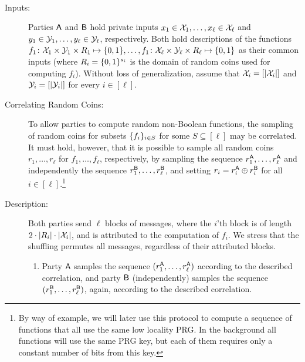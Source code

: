 

\begin{protocol} \label{prot:multi2psm}\
\begin{description}
\item[Inputs:]  Parties $\mathsf{A}$ and $\mathsf{B}$ hold private inputs $x_1\in\mathcal{X}_1, \ldots, x_{\ell}\in\mathcal{X}_{\ell}$ and $y_1\in\mathcal{Y}_1, \ldots, y_{\ell}\in\mathcal{Y}_{\ell}$, respectively. Both hold descriptions of the functions $f_1\colon \mathcal{X}_1\times\mathcal{Y}_1\times R_1\mapsto \{0,1\}, \ldots, f_1\colon \mathcal{X}_{\ell}\times\mathcal{Y}_{\ell}\times R_{\ell}\mapsto \{0,1\}$ as their common inputs (where $R_i=\{0,1\}^{s_i}$ is the domain of random coins used for computing $f_i$). Without loss of generalization, assume that $\mathcal{X}_i = [\left|\mathcal{X}_i\right|]$ and $\mathcal{Y}_i = [\left|\mathcal{Y}_i\right|]$ for every $i\in [\ell]$.

\item[Correlating Random Coins:]
To allow parties to compute random non-Boolean functions, the sampling of random coins for subsets $\{f_i\}_{i\in S}$ for some $S\subseteq[\ell]$ may be correlated. It must hold, however, that it is possible to sample all random coins $r_1,\ldots, r_{\ell}$ for $f_1,\ldots, f_{\ell}$, respectively, by sampling the  sequence $r_1^{\mathsf{A}},\ldots, r_{\ell}^{\mathsf{A}}$ and independently  the  sequence $r_1^{\mathsf{B}},\ldots, r_{\ell}^{\mathsf{B}}$, and setting $r_i = r_i^{\mathsf{A}}\oplus r_i^{\mathsf{B}}$ for all $i\in[\ell]$.\footnote{By way of example, we will later use this protocol to compute a sequence of functions that all use the same low locality PRG. In the background all functions will use the same PRG key, but each of them requires only a constant number of bits from this key.}
\item[Description:]
Both parties send $\ell$ blocks of messages, where the $i$'th block is of length $2\cdot\left|R_i\right|\cdot\left|\mathcal{X}_i\right|$, and is attributed to the computation of $f_i$. We stress that the shuffling permutes all messages, regardless of their attributed blocks.
\begin{enumerate}
\item  Party $\mathsf{A}$ samples the  sequence $(r_1^{\mathsf{A}},\ldots, r_{\ell}^{\mathsf{A}})$ according to the described correlation,   and party $\mathsf{B}$ (independently) samples the  sequence $(r_1^{\mathsf{B}},\ldots, r_{\ell}^{\mathsf{B}})$, again, according to the described correlation.


\end{enumerate}
\end{description}
\end{protocol}
